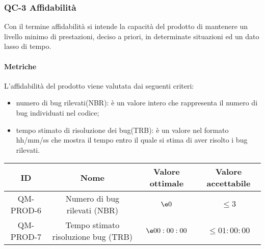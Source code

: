 \subsubsection{QC-3 Affidabilità}
Con il termine affidabilità si intende la capacità del prodotto di mantenere un livello minimo di prestazioni, deciso a priori, in determinate situazioni ed un dato lasso di tempo.

	\paragraph{Metriche}
	L'affidabilità del prodotto viene valutata dai seguenti criteri:
	\begin{itemize}
		\item numero di bug rilevati(NBR): è un valore intero che rappresenta il numero di bug individuati nel codice;
		\item tempo stimato di risoluzione dei bug(TRB): è un valore nel formato hh/mm/ss che mostra il tempo entro il quale si stima di aver risolto i bug rilevati.
	\end{itemize}
	\begin{center}
		\begin{tabular}{|c|c|c|c|}
			\rowcolor{lighter-grayer}
			\hline
			ID & Nome & Valore ottimale & Valore accettabile \\
			\hline
			QM-PROD-6 & Numero di bug rilevati (NBR) & \(\e 0\) &\(\le 3\) \\
			\hline
			QM-PROD-7 & Tempo stimato risoluzione bug (TRB) & \(\e 00:00:00\) & \(\le 01:00:00\) \\
			\hline
		\end{tabular}
	\end{center}
